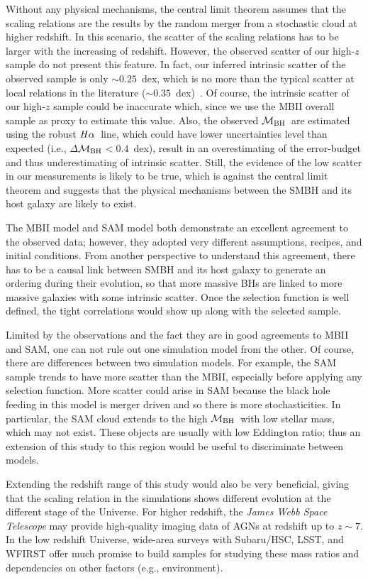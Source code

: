 \documentclass{natureprintstyle}
\newcommand{\mbh}{$\mathcal M_{\rm BH}$}
\newcommand{\halpha}{${\it H}\alpha$}
\begin{document}
Without any physical mechanisms, the central limit theorem assumes that the scaling relations are the results by the random merger from a stochastic cloud at higher redshift. In this scenario, the scatter of the scaling relations has to be larger with the increasing of redshift. However, the observed scatter of our high-$z$ sample do not present this feature. In fact, our inferred intrinsic scatter of the observed sample is only $\sim0.25$~dex, which is no more than the typical scatter at local relations in the literature ($\sim0.35$~dex)~\cite{Kormendy13, Gul++09}. Of course, the intrinsic scatter of our high-$z$ sample could be inaccurate which, 
since we use the MBII overall sample as proxy to estimate this value.
Also, the observed \mbh\ are estimated using the robust \halpha\ line, which could have lower uncertainties level than expected (i.e., $\Delta$\mbh$<0.4$~dex), result in an overestimating of the error-budget and thus underestimating of intrinsic scatter. Still, the evidence of the low scatter in our measurements is likely to be true, which is against the central limit theorem and suggests that the physical mechanisms between the SMBH and its host galaxy are likely to exist. 

The MBII model and SAM model both demonstrate an excellent agreement to the observed data; however, they adopted very different assumptions, recipes, and initial conditions. From another perspective to understand this agreement, there has to be a causal link between SMBH and its host galaxy to generate an ordering during their evolution, so that more massive BHs are linked to more massive galaxies with some intrinsic scatter. Once the selection function is well defined, the tight correlations would show up along with the selected sample.

Limited by the observations and the fact they are in good agreements to MBII and SAM, one can not rule out one simulation model from the other. Of course, there are differences between two simulation models. For example, the SAM sample trends to have more scatter than the MBII, especially before applying any selection function. More scatter could arise in SAM because the black hole feeding in this model is merger driven and so there is more stochasticities. In particular, the SAM cloud extends to the high \mbh\ with low stellar mass, which may not exist. These objects are usually with low Eddington ratio; thus an extension of this study to this region would be useful to discriminate between models.

Extending the redshift range of this study would also be very beneficial, giving that the scaling relation in the simulations shows different evolution at the different stage of the Universe. For higher redshift, the {\it James Webb Space Telescope} may provide high-quality imaging data of AGNs at redshift up to $z\sim7$. In the low redshift Universe, wide-area surveys with Subaru/HSC, LSST, and WFIRST offer much promise to build samples for studying these mass ratios and dependencies on other factors (e.g., environment).
\end{document}
